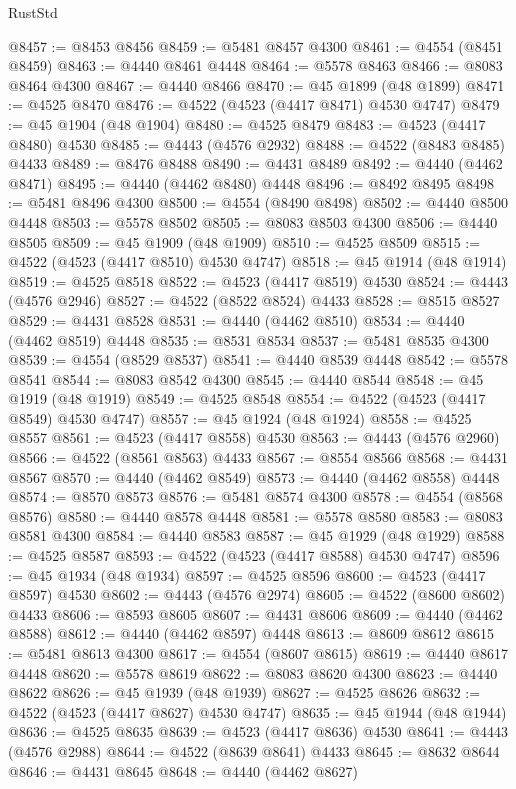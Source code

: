\begin{lexlean}{RustStd}
\begin{coremodule}
{\begin{coremodule}
{{{{{{{{{{{{{{{{{{{{{{{{{{{{{{{{{{{{{{{{{{{{{{{{{{{{{{{{{{{{@8457 := @8453 @8456
@8459 := @5481 @8457 @4300
@8461 := @4554 (@8451 @8459)
@8463 := @4440 @8461 @4448
@8464 := @5578 @8463
@8466 := @8083 @8464 @4300
@8467 := @4440 @8466
@8470 := @45 @1899 (@48 @1899)
@8471 := @4525 @8470
@8476 := @4522 (@4523 (@4417 @8471) @4530 @4747)
@8479 := @45 @1904 (@48 @1904)
@8480 := @4525 @8479
@8483 := @4523 (@4417 @8480) @4530
@8485 := @4443 (@4576 @2932)
@8488 := @4522 (@8483 @8485) @4433
@8489 := @8476 @8488
@8490 := @4431 @8489
@8492 := @4440 (@4462 @8471)
@8495 := @4440 (@4462 @8480) @4448
@8496 := @8492 @8495
@8498 := @5481 @8496 @4300
@8500 := @4554 (@8490 @8498)
@8502 := @4440 @8500 @4448
@8503 := @5578 @8502
@8505 := @8083 @8503 @4300
@8506 := @4440 @8505
@8509 := @45 @1909 (@48 @1909)
@8510 := @4525 @8509
@8515 := @4522 (@4523 (@4417 @8510) @4530 @4747)
@8518 := @45 @1914 (@48 @1914)
@8519 := @4525 @8518
@8522 := @4523 (@4417 @8519) @4530
@8524 := @4443 (@4576 @2946)
@8527 := @4522 (@8522 @8524) @4433
@8528 := @8515 @8527
@8529 := @4431 @8528
@8531 := @4440 (@4462 @8510)
@8534 := @4440 (@4462 @8519) @4448
@8535 := @8531 @8534
@8537 := @5481 @8535 @4300
@8539 := @4554 (@8529 @8537)
@8541 := @4440 @8539 @4448
@8542 := @5578 @8541
@8544 := @8083 @8542 @4300
@8545 := @4440 @8544
@8548 := @45 @1919 (@48 @1919)
@8549 := @4525 @8548
@8554 := @4522 (@4523 (@4417 @8549) @4530 @4747)
@8557 := @45 @1924 (@48 @1924)
@8558 := @4525 @8557
@8561 := @4523 (@4417 @8558) @4530
@8563 := @4443 (@4576 @2960)
@8566 := @4522 (@8561 @8563) @4433
@8567 := @8554 @8566
@8568 := @4431 @8567
@8570 := @4440 (@4462 @8549)
@8573 := @4440 (@4462 @8558) @4448
@8574 := @8570 @8573
@8576 := @5481 @8574 @4300
@8578 := @4554 (@8568 @8576)
@8580 := @4440 @8578 @4448
@8581 := @5578 @8580
@8583 := @8083 @8581 @4300
@8584 := @4440 @8583
@8587 := @45 @1929 (@48 @1929)
@8588 := @4525 @8587
@8593 := @4522 (@4523 (@4417 @8588) @4530 @4747)
@8596 := @45 @1934 (@48 @1934)
@8597 := @4525 @8596
@8600 := @4523 (@4417 @8597) @4530
@8602 := @4443 (@4576 @2974)
@8605 := @4522 (@8600 @8602) @4433
@8606 := @8593 @8605
@8607 := @4431 @8606
@8609 := @4440 (@4462 @8588)
@8612 := @4440 (@4462 @8597) @4448
@8613 := @8609 @8612
@8615 := @5481 @8613 @4300
@8617 := @4554 (@8607 @8615)
@8619 := @4440 @8617 @4448
@8620 := @5578 @8619
@8622 := @8083 @8620 @4300
@8623 := @4440 @8622
@8626 := @45 @1939 (@48 @1939)
@8627 := @4525 @8626
@8632 := @4522 (@4523 (@4417 @8627) @4530 @4747)
@8635 := @45 @1944 (@48 @1944)
@8636 := @4525 @8635
@8639 := @4523 (@4417 @8636) @4530
@8641 := @4443 (@4576 @2988)
@8644 := @4522 (@8639 @8641) @4433
@8645 := @8632 @8644
@8646 := @4431 @8645
@8648 := @4440 (@4462 @8627)
}}}}}}}}}}}}}}}}}}}}}}}}}}}}}}}}}}}}}}}}}}}}}}}}}}}}}}}}}}}}
\end{coremodule}}
\end{coremodule}
\end{lexlean}
